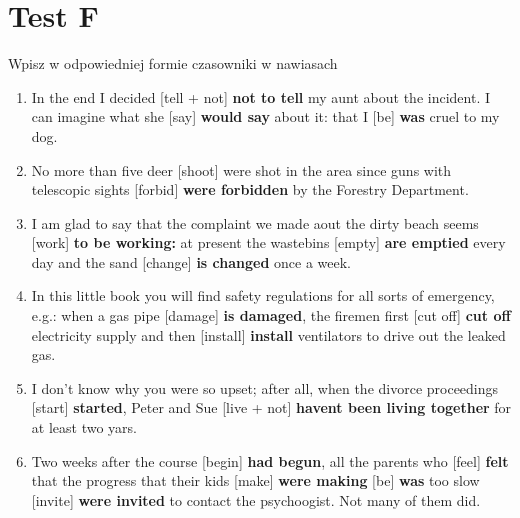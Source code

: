 \documentclass[a4paper]{article}
\begin{document}
\section{Test F}
Wpisz w odpowiedniej formie czasowniki w nawiasach
\begin{enumerate}
    \item In the end I decided [tell + not] {\bf not to tell} my aunt about the incident. I can imagine what she [say] {\bf would say} about it: that I [be] {\bf was} cruel to my dog.
    \item No more than five deer [shoot] were shot in the area since guns with telescopic sights [forbid] {\bf were forbidden} by the Forestry Department.
    \item I am glad to say that the complaint we made aout the dirty beach seems [work] {\bf to be working:} at present the wastebins [empty] {\bf are emptied} every day and the sand [change] {\bf is changed} once a week.
    \item In this little book you will find safety regulations for all sorts of emergency, e.g.: when a gas pipe [damage] {\bf is damaged}, the firemen first [cut off] {\bf cut off} electricity supply and then [install] {\bf install} ventilators to drive out the leaked gas.
    \item I don't know why you were so upset; after all, when the divorce proceedings [start] {\bf started}, Peter and Sue [live + not] {\bf havent been living together} for at least two yars.
    \item Two weeks after the course [begin] {\bf had begun}, all the parents who [feel] {\bf felt} that the progress that their kids [make] {\bf were making} [be] {\bf was} too slow [invite] {\bf were invited} to contact the psychoogist. Not many of them did.
\end{enumerate}
\end{document}
